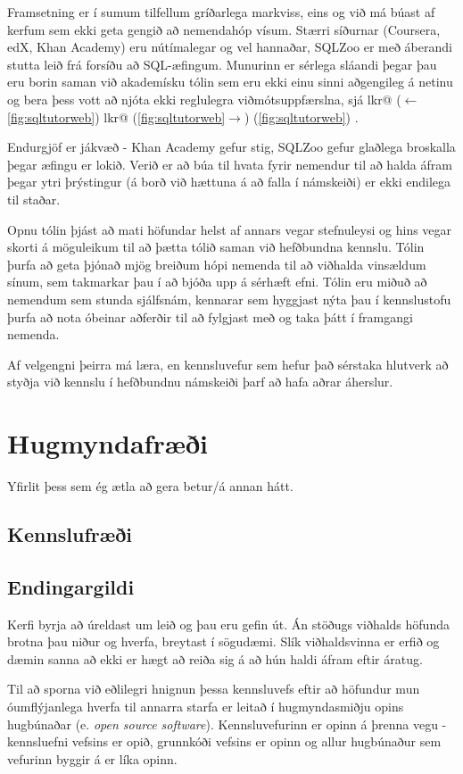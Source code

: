\documentclass[a4paper,12pt,twoside,BCOR=10mm]{scrbook}
\makeatletter
\newcounter{labelknownref}
\renewcommand*{\thelabelknownref}{\the\value{labelknownref}}
\newcommand*{\LabelKnown}[2]{%
  \expandafter\xdef\csname lkr@#2\endcsname{%
    \@ifundefined{r@#1}{0}{1}%
  }%
}
\newcommand*{\myref}[1]{%
  \begingroup
    \stepcounter{labelknownref}%
    \if@filesw
      \protected@write\@auxout{}{%
        \string\LabelKnown{#1}{\thelabelknownref}%
      }%
    \fi 
    \if\csname lkr@\thelabelknownref\endcsname 1%
      ($\leftarrow$\ref{#1})%
    \else
      \if\csname lkr@\thelabelknownref\endcsname 0%
        (\ref{#1}$\rightarrow$)%
      \else
        (\ref{#1})%
      \fi
    \fi
  \endgroup
}
\makeatother
\begin{document}
Framsetning er í sumum tilfellum gríðarlega markviss, eins og við má búast af kerfum sem ekki geta gengið að nemendahóp vísum. Stærri síðurnar (Coursera, edX, Khan Academy) eru nútímalegar og vel hannaðar, SQLZoo er með áberandi stutta leið frá forsíðu að SQL-æfingum. Munurinn er sérlega sláandi þegar þau eru borin saman við akademísku tólin sem eru ekki einu sinni aðgengileg á netinu og bera þess vott að njóta ekki reglulegra viðmótsuppfærslna, sjá \myref{fig:sqltutorweb}.

Endurgjöf er jákvæð - Khan Academy gefur stig, SQLZoo gefur glaðlega broskalla þegar æfingu er lokið. Verið er að búa til hvata fyrir nemendur til að halda áfram þegar ytri þrýstingur (á borð við hættuna á að falla í námskeiði) er ekki endilega til staðar.

Opnu tólin þjást að mati höfundar helst af annars vegar stefnuleysi og hins vegar skorti á möguleikum til að þætta tólið saman við hefðbundna kennslu. Tólin þurfa að geta þjónað mjög breiðum hópi nemenda til að viðhalda vinsældum sínum, sem takmarkar þau í að bjóða upp á sérhæft efni. Tólin eru miðuð að nemendum sem stunda sjálfsnám, kennarar sem hyggjast nýta þau í kennslustofu þurfa að nota óbeinar aðferðir til að fylgjast með og taka þátt í framgangi nemenda.

Af velgengni þeirra má læra, en kennsluvefur sem hefur það sérstaka hlutverk að styðja við kennslu í hefðbundnu námskeiði þarf að hafa aðrar áherslur.
\chapter{Hugmyndafræði}
Yfirlit þess sem ég ætla að gera betur/á annan hátt.
\section{Kennslufræði}
\label{sec:kennslufraedilegar-hugmyndir}
\section{Endingargildi}
Kerfi byrja að úreldast um leið og þau eru gefin út. Án stöðugs viðhalds höfunda brotna þau niður og hverfa, breytast í sögudæmi. Slík viðhaldsvinna er erfið og dæmin\cite{bhagat2002, mitrovic2003intelligent, sadiq2004sqlator} sanna að ekki er hægt að reiða sig á að hún haldi áfram eftir áratug.

Til að sporna við eðlilegri hnignun þessa kennsluvefs eftir að höfundur mun óumflýjanlega hverfa til annarra starfa er leitað í hugmyndasmiðju opins hugbúnaðar (e. \emph{open source software}). Kennsluvefurinn er opinn á þrenna vegu - kennsluefni vefsins er opið, grunnkóði vefsins er opinn og allur hugbúnaður sem vefurinn byggir á er líka opinn.
\end{document}
